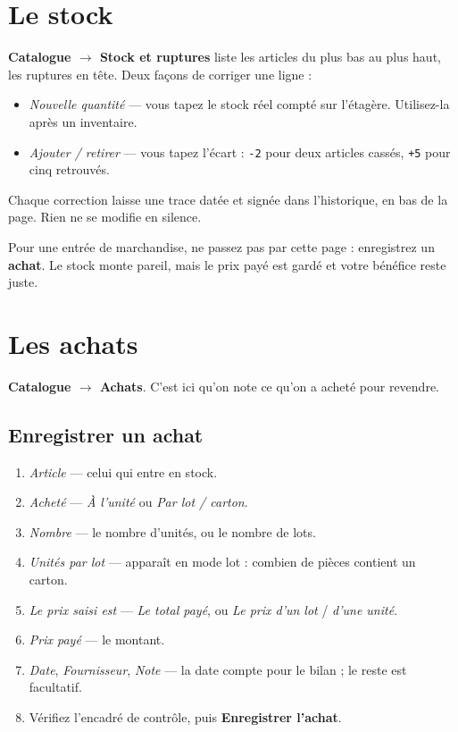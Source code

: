 \documentclass[11pt,a4paper]{article}
\newcommand{\bouton}[1]{\textbf{\textcolor{sig}{#1}}}
\newcommand{\menu}[1]{\textsf{\textbf{#1}}}
\newcommand{\champ}[1]{\textit{#1}}
\begin{document}
\section{Le stock}

\menu{Catalogue $\rightarrow$ Stock et ruptures} liste les articles du plus bas
au plus haut, les ruptures en tête. Deux façons de corriger une ligne :

\begin{itemize}
  \item \champ{Nouvelle quantité} — vous tapez le stock réel compté sur l'étagère. Utilisez-la après un inventaire.
  \item \champ{Ajouter / retirer} — vous tapez l'écart : \texttt{-2} pour deux articles cassés, \texttt{+5} pour cinq retrouvés.
\end{itemize}

Chaque correction laisse une trace datée et signée dans l'historique, en bas de
la page. Rien ne se modifie en silence.

\begin{conseil}
Pour une entrée de marchandise, ne passez pas par cette page : enregistrez un
\textbf{achat}. Le stock monte pareil, mais le prix payé est gardé et votre
bénéfice reste juste.
\end{conseil}

\section{Les achats}
\label{sec:achats}

\menu{Catalogue $\rightarrow$ Achats}. C'est ici qu'on note ce qu'on a acheté
pour revendre.

\subsection{Enregistrer un achat}

\begin{enumerate}
  \item \champ{Article} — celui qui entre en stock.
  \item \champ{Acheté} — \textit{À l'unité} ou \textit{Par lot / carton}.
  \item \champ{Nombre} — le nombre d'unités, ou le nombre de lots.
  \item \champ{Unités par lot} — apparaît en mode lot : combien de pièces contient un carton.
  \item \champ{Le prix saisi est} — \textit{Le total payé}, ou \textit{Le prix d'un lot} / \textit{d'une unité}.
  \item \champ{Prix payé} — le montant.
  \item \champ{Date}, \champ{Fournisseur}, \champ{Note} — la date compte pour le bilan ; le reste est facultatif.
  \item Vérifiez l'encadré de contrôle, puis \bouton{Enregistrer l'achat}.
\end{enumerate}
\end{document}
